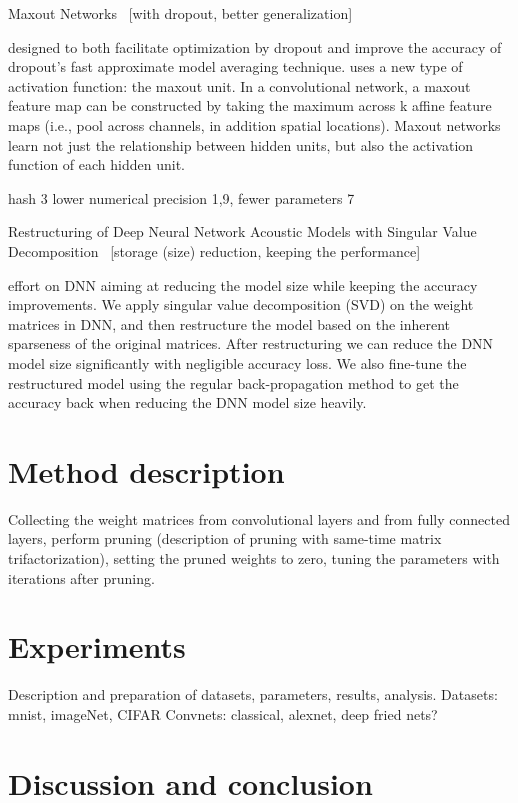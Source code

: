 \documentclass{article} %
\begin{document}
Maxout Networks~\cite{goodfellow2013maxout} [with dropout, better generalization]

designed to both facilitate optimization by dropout and improve the accuracy of dropout’s fast approximate model averaging technique. uses a new type of activation function: the maxout unit. In a convolutional network, a maxout feature map can be constructed by taking the maximum across k affine feature maps (i.e., pool across channels, in addition spatial locations). Maxout networks learn not just the relationship between hidden units, but also the activation function of each hidden unit. 

hash 3
lower numerical precision 1,9, fewer parameters 7

Restructuring of Deep Neural Network Acoustic Models with Singular Value Decomposition~\cite{xue2013restructuring} [storage (size) reduction, keeping the performance]

effort on DNN aiming at reducing the model size while keeping the accuracy improvements. We apply singular value decomposition (SVD) on the weight matrices in DNN, and then restructure the model based on the inherent sparseness of the original matrices. After restructuring we can reduce the DNN model size significantly with negligible accuracy loss. We also fine-tune the restructured model using the regular back-propagation method to get the accuracy back when reducing the DNN model size heavily.


\section{Method description}
Collecting the weight matrices from convolutional layers and from fully connected layers, perform pruning (description of pruning with same-time matrix trifactorization), setting the pruned weights to zero, tuning the parameters with iterations after pruning.

\section{Experiments}
Description and preparation of datasets, parameters, results, analysis.
Datasets: mnist, imageNet, CIFAR
Convnets: classical, alexnet, deep fried nets?


\section{Discussion and conclusion}
\end{document}
